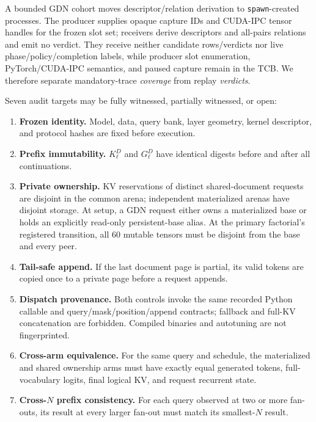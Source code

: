 \documentclass{article}
\begin{document}
A bounded GDN cohort moves descriptor/relation derivation to
\texttt{spawn}-created processes.  The producer supplies opaque capture IDs and
CUDA-IPC tensor handles for the frozen slot set; receivers derive descriptors
and all-pairs relations and emit no verdict.  They receive neither candidate
rows/verdicts nor live phase/policy/completion labels, while producer slot
enumeration, PyTorch/CUDA-IPC semantics, and paused capture remain in the TCB.
We therefore separate mandatory-trace \emph{coverage} from replay
\emph{verdicts}.

Seven audit targets may be fully witnessed, partially witnessed, or open:
\FloatBarrier
\begin{enumerate}
  \setlength{\itemsep}{1pt}
  \setlength{\parskip}{0pt}
  \item \textbf{Frozen identity.}  Model, data, query bank, layer geometry,
  kernel descriptor, and protocol hashes are fixed before execution.
  \item \textbf{Prefix immutability.}  $K^D_\ell$ and $G^D_\ell$ have identical
  digests before and after all continuations.
  \item \textbf{Private ownership.}  KV reservations of distinct
  shared-document requests are disjoint in the common arena; independent
  materialized arenas have disjoint storage.  At setup, a GDN request either
  owns a materialized base or holds an explicitly read-only persistent-base
  alias.  At the primary factorial's registered transition, all 60 mutable tensors must be
  disjoint from the base and every peer.
  \item \textbf{Tail-safe append.}  If the last document page is partial, its
  valid tokens are copied once to a private page before a request appends.
  \item \textbf{Dispatch provenance.}  Both controls invoke the same recorded
  Python callable and query/mask/position/append contracts; fallback and
  full-KV concatenation are forbidden.  Compiled binaries and autotuning are
  not fingerprinted.
  \item \textbf{Cross-arm equivalence.}  For the same query and schedule, the
  materialized and shared ownership arms must have exactly equal generated
  tokens, full-vocabulary logits, final logical KV, and request recurrent
  state.
  \item \textbf{Cross-$N$ prefix consistency.}  For each query observed at two or more
  fan-outs, its result at every larger fan-out must match its smallest-$N$
  result.
\end{enumerate}
\end{document}
